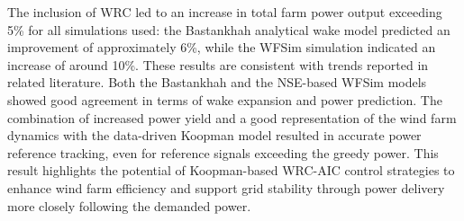 The inclusion of WRC led to an increase in total
farm power output exceeding 5\% for all simulations used: the Bastankhah analytical wake model predicted
an improvement of approximately 6\%, while the WFSim simulation indicated an increase of
around 10\%. These results are consistent with trends reported in related literature. Both the
Bastankhah and the NSE-based WFSim models showed good agreement in
terms of wake expansion and power prediction. The combination of increased power yield and
a good representation of the wind farm dynamics with the data-driven Koopman model resulted in accurate power reference tracking, even for reference
signals exceeding the greedy power. This result highlights the potential of Koopman-based
WRC-AIC control strategies to enhance wind farm efficiency and support grid stability through power delivery more closely following the demanded power.